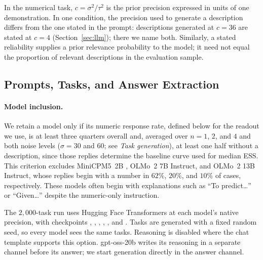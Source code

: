 \documentclass{article}
\theoremstyle{definition}
\begin{document}
In the numerical task, $c=\sigma^2/\tau^2$ is the prior precision expressed in units of one demonstration. In one condition, the precision used to generate a description differs from the one stated in the prompt: descriptions generated at $c=36$ are stated at $c=4$ (Section~\ref{sec:llm}); there we name both. Similarly, a stated reliability supplies a prior relevance probability to the model; it need not equal the proportion of relevant descriptions in the evaluation sample.

\subsection{Prompts, Tasks, and Answer Extraction}\label{app:prompts}

\paragraph{Model inclusion.}
We retain a model only if its numeric response rate, defined below for the readout we use, is at least three quarters overall and, averaged over $n=1$, $2$, and $4$ and both noise levels ($\sigma=30$ and $60$; see \emph{Task generation}), at least one half without a description, since those replies determine the baseline curve used for median ESS. This criterion excludes MiniCPM5~2B \citep{minicpm5}, OLMo~2 7B Instruct, and OLMo~2 13B Instruct, whose replies begin with a number in $62\%$, $20\%$, and $10\%$ of cases, respectively. These models often begin with explanations such as ``To predict\ldots'' or ``Given\ldots'' despite the numeric-only instruction.

The $2{,}000$-task run uses Hugging Face Transformers at each model's native precision, with checkpoints , , , , , and . Tasks are generated with a fixed random seed, so every model sees the same tasks. Reasoning is disabled where the chat template supports this option. gpt-oss-20b writes its reasoning in a separate channel before its answer; we start generation directly in the answer channel.
\end{document}
